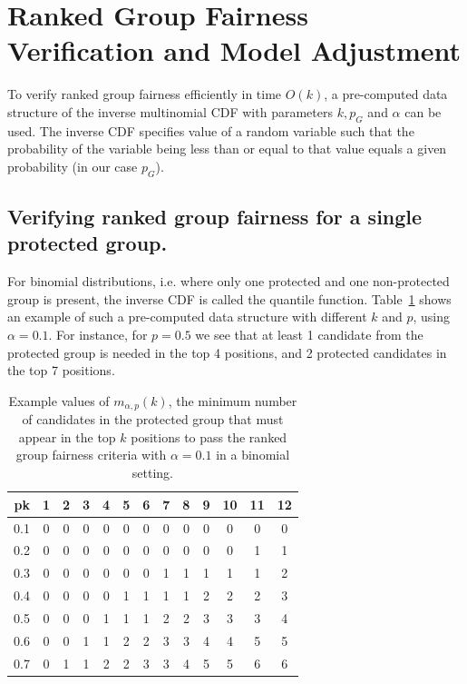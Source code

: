 \section{Ranked Group Fairness Verification and Model Adjustment}
To verify ranked group fairness efficiently in time $O(k)$, a pre-computed data structure of the inverse multinomial CDF with parameters $k, p_G$ and $ \alpha $ can be used.
%
The inverse CDF specifies value of a random variable such that the probability of the variable being less than or equal to that value equals a given probability (in our case $p_G$).
%
\subsection{Verifying ranked group fairness for a single protected group. }
%
For binomial distributions, i.e. where only one protected and one non-protected group is present, the inverse CDF is called the quantile function.
%
Table~\ref{tbl:ranked_group_fairness_table} shows an example of such a pre-computed data structure with different $ k $ and $ p $, using $\alpha=0.1$.
%
For instance, for $p=0.5$ we see that at least 1 candidate from the protected group is needed in the top 4 positions, and 2 protected candidates in the top 7 positions.

\begin{table}[t!]
	\caption{Example values of $m_{\alpha,p}(k)$, the minimum number of candidates in the protected group that must appear in the top $k$ positions to pass the ranked group fairness criteria with $\alpha=0.1$ in a binomial setting.}
	\vspace{-3mm}
	\label{tbl:ranked_group_fairness_table}
	\small\begin{tabular}{r|cccccccccccc}
		\diaghead{some text}%
		{p}{k}&
		1 & 2 & 3 & 4 & 5 & 6 & 7 & 8 & 9 & 10 & 11 & 12 \\ \midrule
		0.1      & 0 & 0 & 0 & 0 & 0 & 0 & 0 & 0 & 0 & 0  &  0 &  0 \\
		0.2      & 0 & 0 & 0 & 0 & 0 & 0 & 0 & 0 & 0 & 0  &  1 &  1 \\
		0.3      & 0 & 0 & 0 & 0 & 0 & 0 & 1 & 1 & 1 & 1  &  1 &  2 \\
		0.4      & 0 & 0 & 0 & 0 & 1 & 1 & 1 & 1 & 2 & 2  &  2 &  3 \\
		0.5      & 0 & 0 & 0 & 1 & 1 & 1 & 2 & 2 & 3 & 3  &  3 &  4 \\
		0.6      & 0 & 0 & 1 & 1 & 2 & 2 & 3 & 3 & 4 & 4  &  5 &  5 \\
		0.7      & 0 & 1 & 1 & 2 & 2 & 3 & 3 & 4 & 5 & 5  &  6 &  6 \\
		\bottomrule
	\end{tabular}
\end{table}

